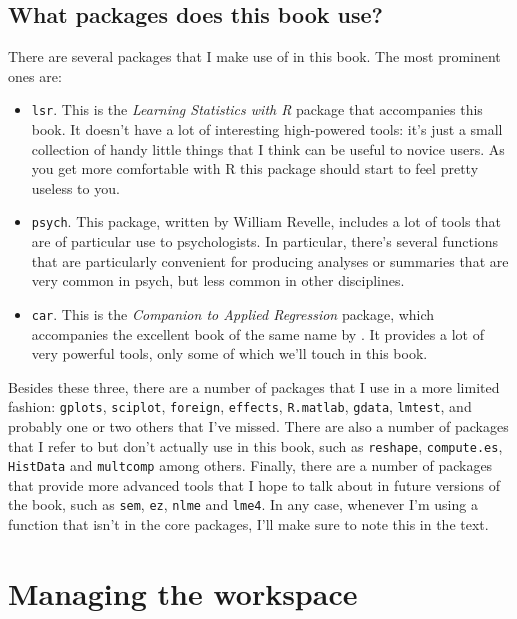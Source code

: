 \documentclass[
]{book}
\providecommand{\tightlist}{%
  \setlength{\itemsep}{0pt}\setlength{\parskip}{0pt}}
\begin{document}
\hypertarget{what-packages-does-this-book-use}{%
\subsection{What packages does this book use?}\label{what-packages-does-this-book-use}}

There are several packages that I make use of in this book. The most prominent ones are:

\begin{itemize}
\tightlist
\item
  \texttt{lsr}. This is the \emph{Learning Statistics with R} package that accompanies this book. It doesn't have a lot of interesting high-powered tools: it's just a small collection of handy little things that I think can be useful to novice users. As you get more comfortable with R this package should start to feel pretty useless to you.
\item
  \texttt{psych}. This package, written by William Revelle, includes a lot of tools that are of particular use to psychologists. In particular, there's several functions that are particularly convenient for producing analyses or summaries that are very common in psych, but less common in other disciplines.
\item
  \texttt{car}. This is the \emph{Companion to Applied Regression} package, which accompanies the excellent book of the same name by \citep{Fox2011}. It provides a lot of very powerful tools, only some of which we'll touch in this book.
\end{itemize}

Besides these three, there are a number of packages that I use in a more limited fashion: \texttt{gplots}, \texttt{sciplot}, \texttt{foreign}, \texttt{effects}, \texttt{R.matlab}, \texttt{gdata}, \texttt{lmtest}, and probably one or two others that I've missed. There are also a number of packages that I refer to but don't actually use in this book, such as \texttt{reshape}, \texttt{compute.es}, \texttt{HistData} and \texttt{multcomp} among others. Finally, there are a number of packages that provide more advanced tools that I hope to talk about in future versions of the book, such as \texttt{sem}, \texttt{ez}, \texttt{nlme} and \texttt{lme4}. In any case, whenever I'm using a function that isn't in the core packages, I'll make sure to note this in the text.

\hypertarget{workspace}{%
\section{Managing the workspace}\label{workspace}}
\end{document}
